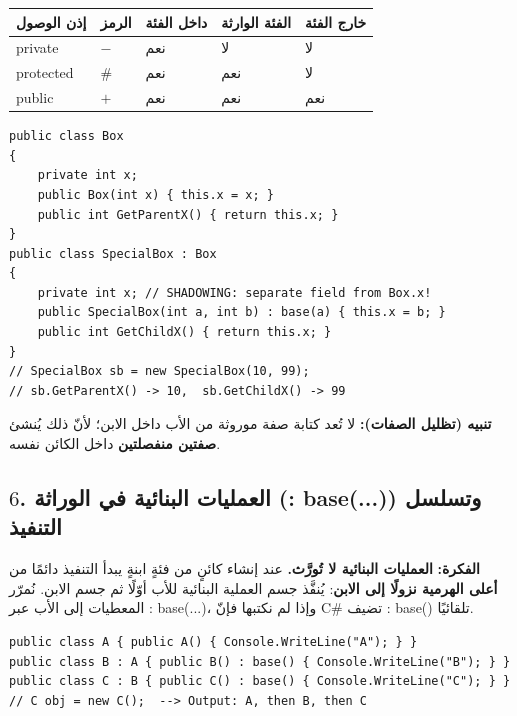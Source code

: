 \documentclass[14pt]{extarticle}
\begin{document}
{\renewcommand{\arraystretch}{1.15}
\small
\begin{longtable}{|C{0.20\textwidth}|C{0.10\textwidth}|C{0.18\textwidth}|C{0.18\textwidth}|C{0.18\textwidth}|}
\hline
\textbf{إذن الوصول} & \textbf{الرمز} & \textbf{داخل الفئة} & \textbf{الفئة الوارثة} & \textbf{خارج الفئة} \\
\hline
\textenglish{private} & $-$ & نعم & لا & لا \\
\hline
\textenglish{protected} & $\#$ & نعم & نعم & لا \\
\hline
\textenglish{public} & $+$ & نعم & نعم & نعم \\
\hline
\end{longtable}}

\begin{boxCode}
\begin{english}
\begin{verbatim}
public class Box
{
    private int x;
    public Box(int x) { this.x = x; }
    public int GetParentX() { return this.x; }
}
public class SpecialBox : Box
{
    private int x; // SHADOWING: separate field from Box.x!
    public SpecialBox(int a, int b) : base(a) { this.x = b; }
    public int GetChildX() { return this.x; }
}
// SpecialBox sb = new SpecialBox(10, 99);
// sb.GetParentX() -> 10,  sb.GetChildX() -> 99
\end{verbatim}
\end{english}
\end{boxCode}

\textbf{تنبيه (تظليل الصفات):} لا تُعد كتابة صفة موروثة من الأب داخل الابن؛ لأنّ ذلك يُنشئ \textbf{صفتين منفصلتين} داخل الكائن نفسه.

\filbreak
\subsection*{$6$. العمليات البنائية في الوراثة (\textenglish{: base(...)}) وتسلسل التنفيذ}
\textbf{الفكرة:} \textbf{العمليات البنائية لا تُورَّث.} عند إنشاء كائنٍ من فئةٍ ابنةٍ يبدأ التنفيذ دائمًا من \textbf{أعلى الهرمية نزولًا إلى الابن}: يُنفَّذ جسم العملية البنائية للأب أوّلًا ثم جسم الابن. نُمرّر المعطيات إلى الأب عبر \textenglish{: base(...)}، وإذا لم نكتبها فإنّ \textenglish{C\#} تضيف \textenglish{: base()} تلقائيًا.

\begin{boxCode}
\begin{english}
\begin{verbatim}
public class A { public A() { Console.WriteLine("A"); } }
public class B : A { public B() : base() { Console.WriteLine("B"); } }
public class C : B { public C() : base() { Console.WriteLine("C"); } }
// C obj = new C();  --> Output: A, then B, then C
\end{verbatim}
\end{english}
\end{boxCode}
\end{document}
